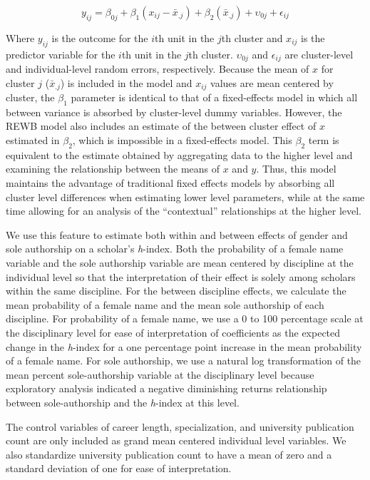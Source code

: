 \documentclass[
  10pt,
  letterpaper,
]{article}
\begin{document}
\[y_{ij}=\beta_{0j}+\beta_1(x_{ij}-\bar{x}_{.j})+\beta_2(\bar{x}_{.j})+\upsilon_{0j}+\epsilon_{ij}\]

Where \(y_{ij}\) is the outcome for the \(i\)th unit in the \(j\)th
cluster and \(x_{ij}\) is the predictor variable for the \(i\)th unit in
the \(j\)th cluster. \(\upsilon_{0j}\) and \(\epsilon_{ij}\) are
cluster-level and individual-level random errors, respectively. Because
the mean of \(x\) for cluster \(j\) (\(\bar{x}_{.j}\)) is included in
the model and \(x_{ij}\) values are mean centered by cluster, the
\(\beta_1\) parameter is identical to that of a fixed-effects model in
which all between variance is absorbed by cluster-level dummy variables.
However, the REWB model also includes an estimate of the between cluster
effect of \(x\) estimated in \(\beta_2\), which is impossible in a
fixed-effects model. This \(\beta_2\) term is equivalent to the estimate
obtained by aggregating data to the higher level and examining the
relationship between the means of \(x\) and \(y\). Thus, this model
maintains the advantage of traditional fixed effects models by absorbing
all cluster level differences when estimating lower level parameters,
while at the same time allowing for an analysis of the ``contextual''
relationships at the higher level.

We use this feature to estimate both within and between effects of
gender and sole authorship on a scholar's \emph{h}-index. Both the
probability of a female name variable and the sole authorship variable
are mean centered by discipline at the individual level so that the
interpretation of their effect is solely among scholars within the same
discipline. For the between discipline effects, we calculate the mean
probability of a female name and the mean sole authorship of each
discipline. For probability of a female name, we use a 0 to 100
percentage scale at the disciplinary level for ease of interpretation of
coefficients as the expected change in the \emph{h}-index for a one
percentage point increase in the mean probability of a female name. For
sole authorship, we use a natural log transformation of the mean percent
sole-authorship variable at the disciplinary level because exploratory
analysis indicated a negative diminishing returns relationship between
sole-authorship and the \emph{h}-index at this level.

The control variables of career length, specialization, and university
publication count are only included as grand mean centered individual
level variables. We also standardize university publication count to
have a mean of zero and a standard deviation of one for ease of
interpretation.
\end{document}
